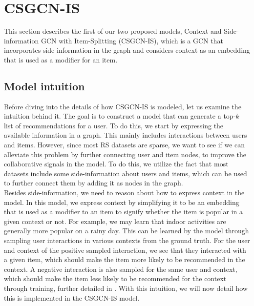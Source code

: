 \section{CSGCN-IS}\label{sec:csgcn_is}
This section describes the first of our two proposed models, Context and Side-information GCN with Item-Splitting (CSGCN-IS), which is a GCN that incorporates side-information in the graph and considers context as an embedding that is used as a modifier for an item.

\subsection{Model intuition}\label{subsec:csgcn_is_intuition}
Before diving into the details of how CSGCN-IS is modeled, let us examine the intuition behind it.
The goal is to construct a model that can generate a top-$k$ list of recommendations for a user.
To do this, we start by expressing the available information in a graph.
This mainly includes interactions between users and items.
However, since most RS datasets are sparse, we want to see if we can alleviate this problem by further connecting user and item nodes, to improve the collaborative signals in the model.
To do this, we utilize the fact that most datasets include some side-information about users and items, which can be used to further connect them by adding it as nodes in the graph.\\
Besides side-information, we need to reason about how to express context in the model.
In this model, we express context by simplifying it to be an embedding that is used as a modifier to an item to signify whether the item is popular in a given context or not.
For example, we may learn that indoor activities are generally more popular on a rainy day.
This can be learned by the model through sampling user interactions in various contexts from the ground truth.
For the user and context of the positive sampled interaction, we see that they interacted with a given item, which should make the item more likely to be recommended in the context.
A negative interaction is also sampled for the same user and context, which should make the item less likely to be recommended for the context through training, further detailed in .
With this intuition, we will now detail how this is implemented in the CSGCN-IS model.

